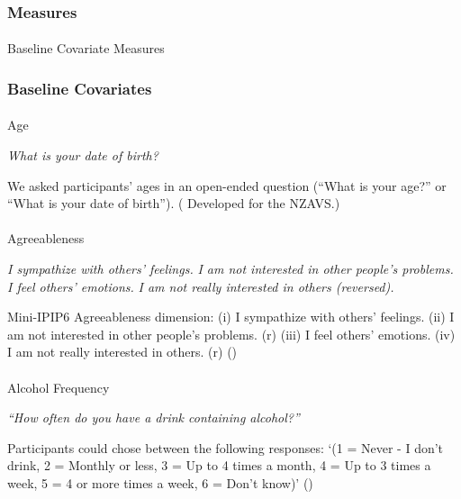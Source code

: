 \documentclass[
  single column]{article}
\makeatletter
\let\oldparagraph\paragraph
\renewcommand{\paragraph}{
    \@ifstar
      \xxxParagraphStar
      \xxxParagraphNoStar
  }
\newcommand{\xxxParagraphStar}[1]{\oldparagraph*{#1}\mbox{}}
\newcommand{\xxxParagraphNoStar}[1]{\oldparagraph{#1}\mbox{}}
\makeatother
\begin{document}
\subsubsection{Measures}\label{measures}

\paragraph{Baseline Covariate
Measures}\label{baseline-covariate-measures}

\subsubsection{Baseline Covariates}\label{baseline-covariates}

\paragraph{Age}\label{age}

\emph{What is your date of birth?}

We asked participants' ages in an open-ended question (``What is your
age?'' or ``What is your date of birth'').
( Developed for the
NZAVS.)

\paragraph{Agreeableness}\label{agreeableness}

\emph{I sympathize with others' feelings.} \emph{I am not interested in
other people's problems.} \emph{I feel others' emotions.} \emph{I am not
really interested in others (reversed).}

Mini-IPIP6 Agreeableness dimension: (i) I sympathize with others'
feelings. (ii) I am not interested in other people's problems. (r) (iii)
I feel others' emotions. (iv) I am not really interested in others. (r)
()

\paragraph{Alcohol Frequency}\label{alcohol-frequency}

\emph{``How often do you have a drink containing alcohol?''}

Participants could chose between the following responses: `(1 = Never -
I don't drink, 2 = Monthly or less, 3 = Up to 4 times a month, 4 = Up to
3 times a week, 5 = 4 or more times a week, 6 = Don't know)'
()
\end{document}
